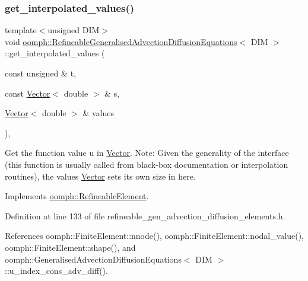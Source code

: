 \subsubsection{\texorpdfstring{get\+\_\+interpolated\+\_\+values()}{get\_interpolated\_values()}\hspace{0.1cm}{\footnotesize\ttfamily [2/2]}}
{\footnotesize\ttfamily template$<$unsigned D\+IM$>$ \\
void \hyperlink{classoomph_1_1RefineableGeneralisedAdvectionDiffusionEquations}{oomph\+::\+Refineable\+Generalised\+Advection\+Diffusion\+Equations}$<$ D\+IM $>$\+::get\+\_\+interpolated\+\_\+values (\begin{DoxyParamCaption}\item[{const unsigned \&}]{t,  }\item[{const \hyperlink{classoomph_1_1Vector}{Vector}$<$ double $>$ \&}]{s,  }\item[{\hyperlink{classoomph_1_1Vector}{Vector}$<$ double $>$ \&}]{values }\end{DoxyParamCaption})\hspace{0.3cm}{\ttfamily [inline]}, {\ttfamily [virtual]}}



Get the function value u in \hyperlink{classoomph_1_1Vector}{Vector}. Note\+: Given the generality of the interface (this function is usually called from black-\/box documentation or interpolation routines), the values \hyperlink{classoomph_1_1Vector}{Vector} sets its own size in here. 



Implements \hyperlink{classoomph_1_1RefineableElement_ada6f0efe831ffefb1d2829ce01d45bfc}{oomph\+::\+Refineable\+Element}.



Definition at line 133 of file refineable\+\_\+gen\+\_\+advection\+\_\+diffusion\+\_\+elements.\+h.



References oomph\+::\+Finite\+Element\+::nnode(), oomph\+::\+Finite\+Element\+::nodal\+\_\+value(), oomph\+::\+Finite\+Element\+::shape(), and oomph\+::\+Generalised\+Advection\+Diffusion\+Equations$<$ D\+I\+M $>$\+::u\+\_\+index\+\_\+cons\+\_\+adv\+\_\+diff().

\mbox{\label{classoomph_1_1RefineableGeneralisedAdvectionDiffusionEquations_a097fa9a13ecaebe0c3801c98a057d5ec}} 
